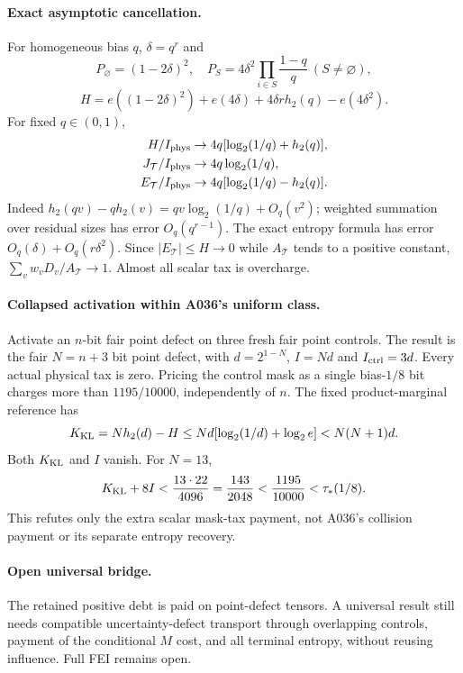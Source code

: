 \documentclass[11pt]{article}
\begin{document}
\paragraph{Exact asymptotic cancellation.}
For homogeneous bias $q$, $\delta=q^r$ and
\[
 P_\varnothing=(1-2\delta)^2,\quad
 P_S=4\delta^2\prod_{i\in S}\frac{1-q}{q}\ (S\ne\varnothing),
\]
\[
 H=e((1-2\delta)^2)+e(4\delta)+4\delta r h_2(q)-e(4\delta^2).
\]
For fixed $q\in(0,1)$,
\begin{align*}
 H/I_{\rm phys}&\to4q[\log_2(1/q)+h_2(q)],\\
 J_{\mathcal T}/I_{\rm phys}&\to4q\log_2(1/q),\\
 E_{\mathcal T}/I_{\rm phys}&\to4q[\log_2(1/q)-h_2(q)].
\end{align*}
Indeed $h_2(qv)-qh_2(v)=qv\log_2(1/q)+O_q(v^2)$;
weighted summation over residual sizes has error $O_q(q^{r-1})$.
The exact entropy formula has error $O_q(\delta)+O_q(r\delta^2)$.
Since $|E_{\mathcal T}|\le H\to0$ while $A_{\mathcal T}$ tends to a positive constant,
$\sum_vw_vD_v/A_{\mathcal T}\to1$. Almost all scalar tax is overcharge.

\paragraph{Collapsed activation within A036's uniform class.}
Activate an $n$-bit fair point defect on three fresh fair point controls.
The result is the fair $N=n+3$ bit point defect, with $d=2^{1-N}$,
$I=Nd$ and $I_{\rm ctrl}=3d$. Every actual physical tax is zero.
Pricing the control mask as a single bias-$1/8$ bit charges more than
$1195/10000$, independently of $n$.
The fixed product-marginal reference has
\[
 K_{\rm KL}=Nh_2(d)-H\le Nd[\log_2(1/d)+\log_2e]<N(N+1)d.
\]
Both $K_{\rm KL}$ and $I$ vanish. For $N=13$,
\[
 K_{\rm KL}+8I<\frac{13\cdot22}{4096}
 =\frac{143}{2048}<\frac{1195}{10000}<\tau_*(1/8).
\]
This refutes only the extra scalar mask-tax payment, not A036's collision payment
or its separate entropy recovery.

\paragraph{Open universal bridge.}
The retained positive debt is paid on point-defect tensors. A universal result still
needs compatible uncertainty-defect transport through overlapping controls,
payment of the conditional $M$ cost, and all terminal entropy, without reusing influence.
Full FEI remains open.
\end{document}
